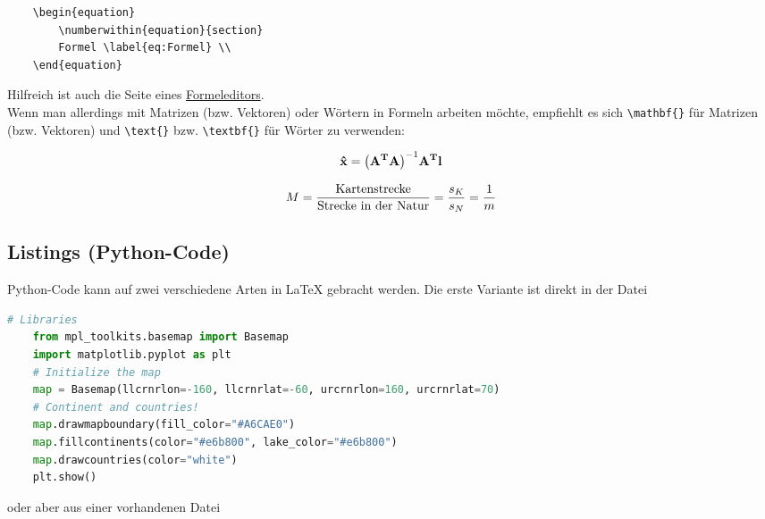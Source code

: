 \begin{verbatim}
    \begin{equation}
        \numberwithin{equation}{section}
        Formel \label{eq:Formel} \\
    \end{equation}
\end{verbatim}

Hilfreich ist auch die Seite eines \href{https://www.codecogs.com/latex/eqneditor.php}{Formeleditors}.\\

Wenn man allerdings mit Matrizen (bzw. Vektoren) oder Wörtern in Formeln arbeiten möchte, empfiehlt es sich \verb|\mathbf{}| für Matrizen (bzw. Vektoren) und \verb|\text{}| bzw. \verb|\textbf{}| für Wörter zu verwenden:

\begin{equation}
	\numberwithin{equation}{section}
	\mathbf{\hat{x}} = \mathbf{\left(A^T A\right)}^{-1} \mathbf{A^T l} \label{eq:Ausgleichung} \\
\end{equation}

\begin{equation}
	\numberwithin{equation}{section}
	M = \frac{\text{Kartenstrecke}}{\text{Strecke in der Natur}} = \frac{s_K}{s_N} = \frac{1}{m} \label{eq:Maßstab} \\
\end{equation}


\subsection{Listings (Python-Code)}

Python-Code kann auf zwei verschiedene Arten in \LaTeX{} gebracht werden. Die erste Variante ist direkt in der Datei

\begin{lstlisting}[language=Python, style=Python, caption=Basemap-Anwendung, label={lst:basemap}]
	# Libraries
	from mpl_toolkits.basemap import Basemap
	import matplotlib.pyplot as plt
	# Initialize the map
	map = Basemap(llcrnrlon=-160, llcrnrlat=-60, urcrnrlon=160, urcrnrlat=70)
	# Continent and countries!
	map.drawmapboundary(fill_color="#A6CAE0")
	map.fillcontinents(color="#e6b800", lake_color="#e6b800")
	map.drawcountries(color="white")
	plt.show()
\end{lstlisting} 

oder aber aus einer vorhandenen Datei




